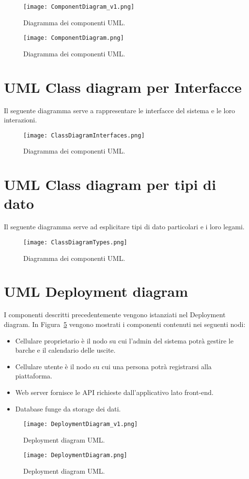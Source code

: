 \begin{figure}[h]
    \centering
    \texttt{[image: ComponentDiagram\_v1.png]}
    \caption{Diagramma dei componenti UML.}\label{fig:componentDiagram}
\end{figure}
\begin{figure}[h]
    \centering
    \texttt{[image: ComponentDiagram.png]}
    \caption{Diagramma dei componenti UML.}\label{fig:componentDiagramLinda}
\end{figure}

\section{UML Class diagram per Interfacce}
Il seguente diagramma serve a rappresentare le interfacce del sistema e le loro interazioni.
\begin{figure}[h]
    \centering
    \texttt{[image: ClassDiagramInterfaces.png]}
    \caption{Diagramma dei componenti UML.}\label{fig:ClassDiagramInterfaces}
\end{figure}

\section{UML Class diagram per tipi di dato}
Il seguente diagramma serve ad esplicitare tipi di dato particolari e i loro legami.
\begin{figure}[h]
    \centering
    \texttt{[image: ClassDiagramTypes.png]}
    \caption{Diagramma dei componenti UML.}\label{fig:ClassDiagramTypes}
\end{figure}

\section{UML Deployment diagram}
I componenti descritti precedentemente vengono istanziati nel Deployment diagram. In Figura~\ref{fig:deploymentDiagram} vengono mostrati i componenti contenuti nei seguenti nodi:

\begin{itemize}
    \item Cellulare proprietario è il nodo su cui l'admin del sistema potrà gestire le barche e il calendario delle uscite.
    \item Cellulare utente è il nodo su cui una persona potrà registrarsi alla piattaforma.
    \item Web server fornisce le API richieste dall'applicativo lato front-end.
    \item Database funge da storage dei dati.
\end{itemize}

\begin{figure}[h]
    \centering
    \texttt{[image: DeploymentDiagram\_v1.png]}
    \caption{Deployment diagram UML.}\label{fig:deploymentDiagram}
\end{figure}
\begin{figure}[h]
    \centering
    \texttt{[image: DeploymentDiagram.png]}
    \caption{Deployment diagram UML.}\label{fig:deploymentDiagramLinda}
\end{figure}